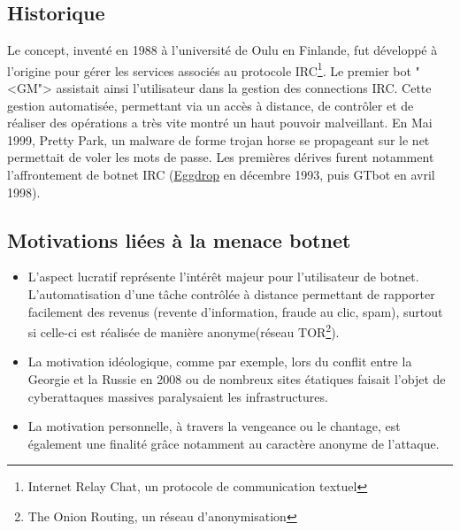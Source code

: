 \subsection{Historique}
\par
Le concept, inventé en 1988 à l'université de Oulu en Finlande, fut développé à l'origine pour gérer les services associés au protocole IRC\footnote{Internet Relay Chat, un protocole de communication textuel}.
\newline
Le premier bot "<GM"> assistait ainsi l'utilisateur dans la gestion des connections IRC.
Cette gestion automatisée, permettant via un accès à distance, de contrôler et de réaliser des opérations a très vite montré un haut pouvoir malveillant.
\newline
En Mai 1999, Pretty Park, un malware de forme trojan horse se propageant sur le net permettait de voler les mots de passe.
\newline
Les premières dérives furent notamment l'affrontement de botnet IRC (\href{https://www.eggheads.org/}{Eggdrop} en décembre 1993, puis GTbot en avril 1998).
\subsection{Motivations liées à la menace botnet}
\begin{itemize}
	\item L'aspect lucratif représente l'intérêt majeur pour l'utilisateur de botnet. L'automatisation d'une tâche contrôlée à distance permettant de rapporter facilement des revenus (revente d'information, fraude au clic, spam), surtout si celle-ci est réalisée de manière anonyme(réseau TOR\footnote{The Onion Routing, un réseau d'anonymisation}).
	\item La motivation idéologique, comme par exemple, lors du conflit entre la Georgie et la Russie en 2008 ou de nombreux sites étatiques faisait l'objet de cyberattaques massives paralysaient les infrastructures.
	\item La motivation personnelle, à travers la vengeance ou le chantage, est également une finalité grâce notamment au caractère anonyme de l'attaque.
\end{itemize}



